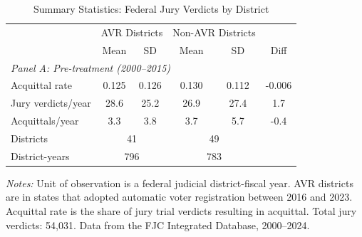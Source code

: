\begin{table}[htbp]
\centering
\caption{Summary Statistics: Federal Jury Verdicts by District}
\label{tab:summary}
\begin{tabular}{lccccc}
\hline\hline
 & \multicolumn{2}{c}{AVR Districts} & \multicolumn{2}{c}{Non-AVR Districts} & \\
 & Mean & SD & Mean & SD & Diff \\
\hline
\multicolumn{6}{l}{\textit{Panel A: Pre-treatment (2000--2015)}} \\
Acquittal rate & 0.125 & 0.126 & 0.130 & 0.112 & -0.006 \\
Jury verdicts/year & 28.6 & 25.2 & 26.9 & 27.4 & 1.7 \\
Acquittals/year & 3.3 & 3.8 & 3.7 & 5.7 & -0.4 \\
\hline
Districts & \multicolumn{2}{c}{41} & \multicolumn{2}{c}{49} & \\
District-years & \multicolumn{2}{c}{796} & \multicolumn{2}{c}{783} & \\
\hline\hline
\end{tabular}
\begin{tablenotes}
\item \textit{Notes:} Unit of observation is a federal judicial district-fiscal year. AVR districts are in states that adopted automatic voter registration between 2016 and 2023. Acquittal rate is the share of jury trial verdicts resulting in acquittal. Total jury verdicts: 54,031. Data from the FJC Integrated Database, 2000--2024.
\end{tablenotes}
\end{table}


